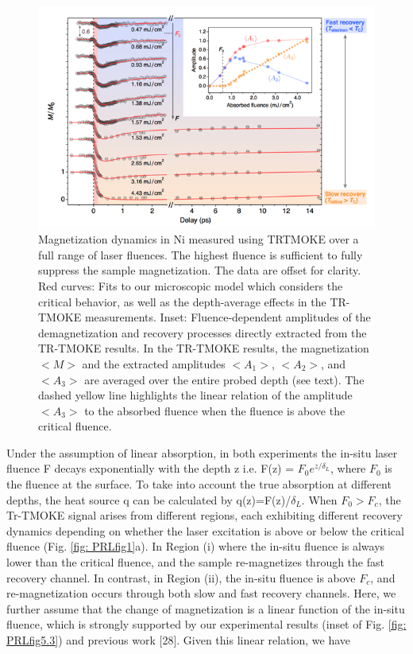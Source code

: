 \begin{figure}
	\label{fig: PRLfig3}
	\begin{center}
		\includegraphics[width=150mm]{figs/PRLFig3}
	\end{center}
\caption{Magnetization dynamics in Ni measured using TRTMOKE over a full range of laser fluences. The highest fluence is sufficient to fully suppress the sample magnetization. The data are offset for clarity. Red curves: Fits to our microscopic model which considers the critical behavior, as well as the depth-average effects in the TR-TMOKE measurements. Inset: Fluence-dependent amplitudes of the demagnetization and recovery processes directly extracted from the TR-TMOKE results. In the TR-TMOKE results, the magnetization $<M>$ and the extracted amplitudes $<A_1>$, $<A_2>$, and $<A_3>$ are averaged over the entire probed depth (see text). The dashed yellow line highlights the linear relation of the amplitude $<A_3>$ to the absorbed fluence when the fluence is above the critical fluence.}
\end{figure}

Under the assumption of linear absorption, in both experiments the in-situ laser fluence F decays exponentially with the depth z i.e. F(z) = $F_0 e^{z/\delta_L}$, where $F_0$ is the fluence at the surface. To take into account the true absorption at different depths, the heat source q can be calculated by q(z)=F(z)/$\delta_L$. When  $F_0 > F_c$, the Tr-TMOKE signal arises from different regions, each exhibiting different recovery dynamics depending on whether the laser excitation is above or below the critical fluence (Fig. \ref{fig: PRLfig1}a). In Region (i) where the in-situ fluence is always lower than the critical fluence, and the sample re-magnetizes through the fast recovery channel. In contrast, in Region (ii), the in-situ fluence is above $F_c$, and re-magnetization occurs through both slow and fast recovery channels.  Here, we further assume that the change of magnetization is a linear function of the in-situ fluence, which is strongly supported by our experimental results (inset of Fig. \ref{fig: PRLfig5.3}) and previous work [28]. Given this linear relation, we have 

